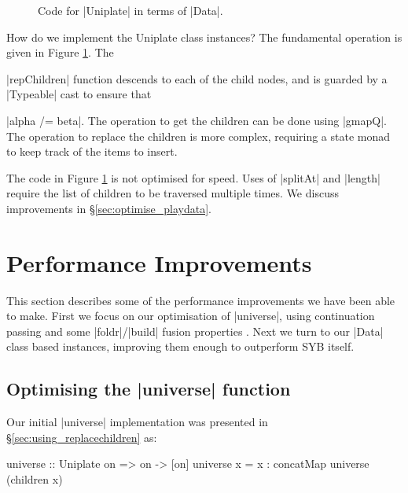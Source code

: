 \begin{figure}
\ignore{}
\caption{Code for |Uniplate| in terms of |Data|.}
\label{fig:playdata}
\end{figure}

How do we implement the Uniplate class instances? The fundamental operation is given in Figure \ref{fig:playdata}. The \ignore|repChildren| function descends to each of the child nodes, and is guarded by a |Typeable| cast to ensure that \ignore|alpha /= beta|. The operation to get the children can be done using |gmapQ|. The operation to replace the children is more complex, requiring a state monad to keep track of the items to insert.

The code in Figure \ref{fig:playdata} is not optimised for speed. Uses of |splitAt| and |length| require the list of children to be traversed multiple times. We discuss improvements in \S\ref{sec:optimise_playdata}.


\section{Performance Improvements}
\label{sec:performance}

This section describes some of the performance improvements we have been able to make. First we focus on our optimisation of |universe|, using continuation passing and some |foldr|/|build| fusion properties \cite{spj:rules}. Next we turn to our |Data| class based instances, improving them enough to outperform SYB itself.

\subsection{Optimising the |universe| function}
\label{sec:optimise_everything}

Our initial |universe| implementation was presented in \S\ref{sec:using_replacechildren} as:

\begin{code}
universe :: Uniplate on => on -> [on]
universe x = x : concatMap universe (children x)
\end{code}


